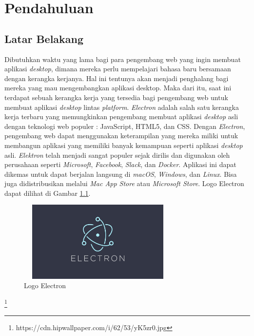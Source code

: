 \chapter{Pendahuluan}
\label{chap:intro}
   
\section{Latar Belakang}
\label{sec:label}

Dibutuhkan waktu yang lama bagi para pengembang web yang ingin membuat aplikasi \textit{desktop}, dimana mereka perlu mempelajari bahasa baru bersamaan dengan kerangka kerjanya. Hal ini tentunya akan menjadi penghalang bagi mereka yang mau mengembangkan aplikasi desktop. Maka dari itu, saat ini terdapat sebuah kerangka kerja yang tersedia bagi pengembang web untuk membuat aplikasi \textit{desktop} lintas \textit{platform}. \textit{Electron} adalah salah satu kerangka kerja terbaru yang memungkinkan pengembang membuat aplikasi \textit{desktop} asli dengan teknologi web populer : JavaScript, HTML5, dan CSS. Dengan \textit{Electron}, pengembang web dapat menggunakan keterampilan yang mereka miliki untuk membangun aplikasi yang memiliki banyak kemampuan seperti aplikasi \textit{desktop} asli. \textit{Elektron} telah menjadi sangat populer sejak dirilis dan digunakan oleh perusahaan seperti \textit{Microsoft}, \textit{Facebook}, \textit{Slack}, dan \textit{Docker}. Aplikasi ini dapat dikemas untuk dapat berjalan langsung di \textit{macOS}, \textit{Windows}, dan \textit{Linux}. Bisa juga didistribusikan melalui \textit{Mac App Store} atau \textit{Microsoft Store}. Logo Electron dapat dilihat di Gambar \ref{fig:gambar1}.

\begin{figure} [H]
    \centering
    \includegraphics[width=8cm, height=4cm]{Gambar/Electron.jpg}
    \caption{Logo Electron}
    \label{fig:gambar1}
\end{figure}

\footnote{https://cdn.hipwallpaper.com/i/62/53/yK5zr0.jpg}

